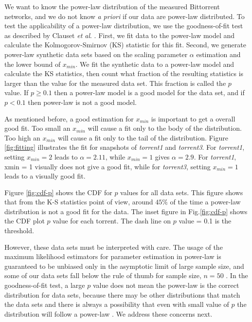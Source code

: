 We want to know the power-law distribution of the measured Bittorrent networks, and we do not know \textit{a priori} if our data are power-law distributed.
To test the applicability of a power-law distribution, we use the goodness-of-fit test as described by Clauset \textit{et al}. \cite{clauset2009power}. 
First, we fit data to the power-law model and calculate the Kolmogorov-Smirnov (KS) statistic for this fit. 
Second, we generate power-law synthetic data sets based on the scaling parameter $\alpha$ estimation and the lower bound of $x_{min}$. 
We fit the synthetic data to a power-law model and calculate the KS statistics, then count what fraction of the resulting statistics is larger than the value for the measured data set. 
This fraction is called the $p$ value.  
If $p \geq 0.1$ then a power-law model is a good model for the data set, and if $p < 0.1$ then power-law is not a good model.

As mentioned before, a good estimation for $x_{min}$ is important to get a overall good fit.
Too small an $x_{min}$ will cause a fit only to the body of the distribution.
Too high an $x_{min}$ will cause a fit only to the tail of the distribution.
Figure \ref{fig:fitting} illustrates the fit for snapshots of \emph{torrent1} and \emph{torrent3}.
For \emph{torrent1}, setting $x_{min}=2$  leads to  $\alpha=2.11$, while $x_{min}=1$ gives $\alpha=2.9$.
For \emph{torrent1}, xmin = 1 visually does not give a good fit, while for  \emph{torrent3}, setting $x_{min}=1$ leads to a visually good fit.

Figure \ref{fig:cdf-p} shows the CDF for $p$ values for all data sets. 
This figure shows that from the K-S statistics point of view, around $45\%$ of the time a power-law distribution is not a good fit for the data. 
The inset figure in Fig.\ref{fig:cdf-p} shows the CDF plot $p$ value for each torrent. 
The dash line on $p$ value = 0.1 is the threshold.

However, these data sets must be interpreted with care. 
The usage of the maximum likelihood estimators for parameter estimation in power-law is guaranteed to be unbiased only in the asymptotic limit of large sample size, and some of our data sets fall below the rule of thumb for sample size, $n=50$ \cite{clauset2009power}. 
In the goodness-of-fit test, a large $p$ value does not mean the power-law  is the correct distribution for data sets, because there may be other distributions that match the data sets and there is always a possibility that even with small value of $p$ the distribution will follow a power-law \cite{clauset2009power}. 
We address these concerns next.

